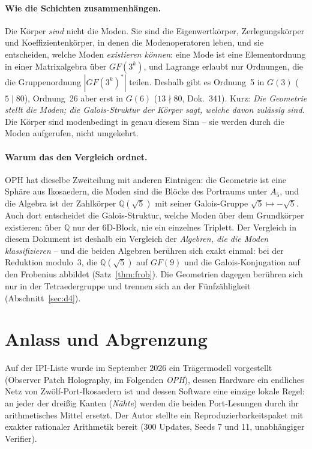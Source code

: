 \paragraph{Wie die Schichten zusammenhängen.} Die Körper \emph{sind} nicht
die Moden. Sie sind die Eigenwertkörper, Zerlegungskörper und
Koeffizientenkörper, in denen die Modenoperatoren leben, und sie
entscheiden, welche Moden \emph{existieren können}: eine Mode ist eine
Elementordnung in einer Matrixalgebra über $GF(3^k)$, und Lagrange
erlaubt nur Ordnungen, die die Gruppenordnung $|GF(3^k)^*|$ teilen.
Deshalb gibt es Ordnung~5 in $G(3)$ ($5\mid80$), Ordnung~26 aber erst in
$G(6)$ ($13\nmid80$, Dok.~341). Kurz: \emph{Die Geometrie stellt die
Moden; die Galois-Struktur der Körper sagt, welche davon zulässig sind.}
Die Körper sind modenbedingt in genau diesem Sinn -- sie werden durch die
Moden aufgerufen, nicht umgekehrt.

\paragraph{Warum das den Vergleich ordnet.} OPH hat dieselbe Zweiteilung
mit anderen Einträgen: die Geometrie ist eine Sphäre aus Ikosaedern, die
Moden sind die Blöcke des Portraums unter $A_5$, und die Algebra ist der
Zahlkörper $\mathbb{Q}(\sqrt5)$ mit seiner Galois-Gruppe $\sqrt5\mapsto-\sqrt5$.
Auch dort entscheidet die Galois-Struktur, welche Moden über dem
Grundkörper existieren: über $\mathbb{Q}$ nur der 6D-Block, nie ein
einzelnes Triplett. Der Vergleich in diesem Dokument ist deshalb ein
Vergleich der \emph{Algebren, die die Moden klassifizieren} -- und die
beiden Algebren berühren sich exakt einmal: bei der Reduktion modulo~3,
die $\mathbb{Q}(\sqrt5)$ auf $GF(9)$ und die Galois-Konjugation auf den
Frobenius abbildet (Satz~\ref{thm:frob}). Die Geometrien dagegen
berühren sich nur in der Tetraedergruppe und trennen sich an der
Fünfzähligkeit (Abschnitt~\ref{sec:d4}).

\section{Anlass und Abgrenzung}

Auf der IPI-Liste wurde im September 2026 ein Trägermodell vorgestellt
(Observer Patch Holography, im Folgenden \emph{OPH}), dessen Hardware ein
endliches Netz von Zwölf-Port-Ikosaedern ist und dessen Software eine
einzige lokale Regel: an jeder der dreißig Kanten (\emph{Nähte}) werden
die beiden Port-Lesungen durch ihr arithmetisches Mittel ersetzt. Der Autor
stellte ein Reproduzierbarkeitspaket mit exakter rationaler Arithmetik
bereit (300 Updates, Seeds 7 und 11, unabhängiger Verifier).


